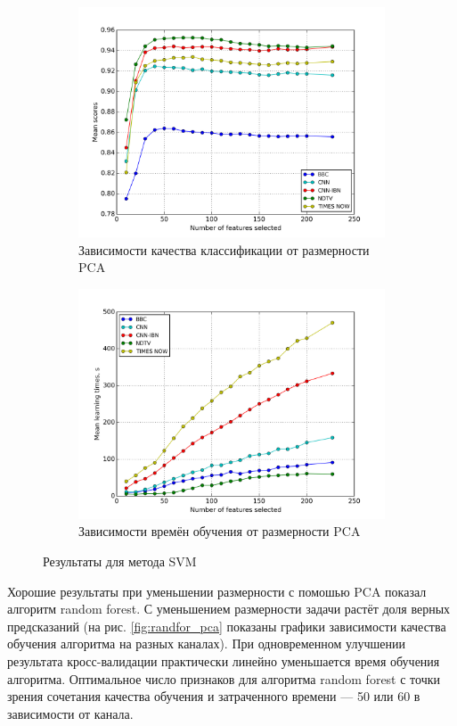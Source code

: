 \begin{figure}[h!]
    \centering
	\begin{subfigure}{0.45\textwidth}
		\includegraphics[width=\textwidth]{images/PCA-SVM.png}
		\caption{Зависимости качества классификации от размерности PCA}
	\end{subfigure}
	\begin{subfigure}{0.45\textwidth}
		\includegraphics[width=\textwidth]{images/PCA-SVMTime.png}
		\caption{Зависимости времён обучения от размерности PCA}
	\end{subfigure}
	\caption{Результаты для метода SVM}\label{fig:svm_pca}
\end{figure}

\par
 Хорошие результаты при уменьшении размерности с помошью PCA показал алгоритм random forest. С уменьшением размерности задачи растёт доля верных предсказаний (на рис. \ref{fig:randfor_pca} показаны графики 
 зависимости качества обучения алгоритма на разных каналах).
 При одновременном улучшении результата кросс-валидации практически линейно уменьшается время обучения алгоритма. Оптимальное число признаков для алгоритма random forest с точки зрения сочетания качества обучения и затраченного времени --- 50 или 60 в зависимости от канала.
 
